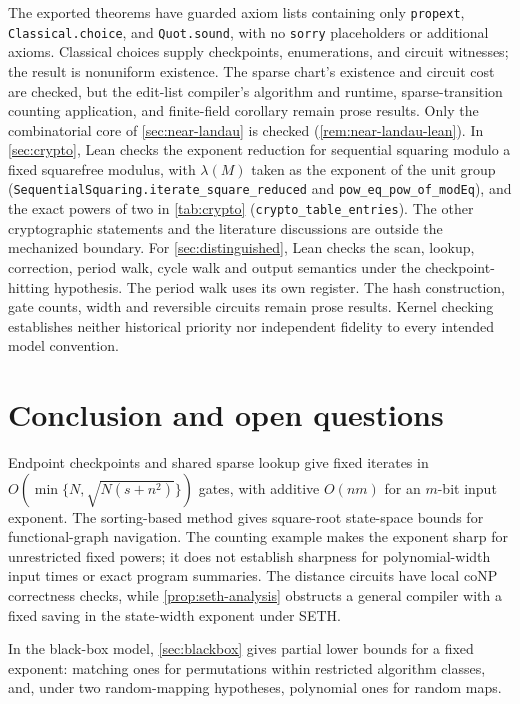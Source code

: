 \documentclass[11pt]{article}
\theoremstyle{definition}
\theoremstyle{remark}
\numberwithin{equation}{section}
\begin{document}
The exported theorems have guarded axiom lists containing only
\texttt{propext}, \texttt{Classical.choice}, and \texttt{Quot.sound}, with no
\texttt{sorry} placeholders or additional axioms.  Classical choices supply
checkpoints, enumerations, and circuit witnesses; the result is nonuniform
existence.  The sparse chart's existence and circuit cost are checked, but
the edit-list compiler's algorithm and runtime, sparse-transition counting
application, and finite-field corollary remain prose results.  Only
the combinatorial core of \cref{sec:near-landau} is checked
(\cref{rem:near-landau-lean}).  In
\cref{sec:crypto}, Lean checks the exponent reduction for sequential
squaring modulo a fixed squarefree modulus, with $\lambda(M)$ taken as
the exponent of the unit group
(\texttt{SequentialSquaring.iterate\_square\_reduced} and
\texttt{pow\_eq\_pow\_of\_modEq}), and the exact powers of two in
\cref{tab:crypto} (\texttt{crypto\_table\_entries}).  The other
cryptographic statements and the literature discussions are outside the
mechanized boundary.  For \cref{sec:distinguished}, Lean checks the scan, lookup, correction,
period walk, cycle walk and output semantics under the checkpoint-hitting
hypothesis.  The period walk uses its own register.  The hash construction,
gate counts, width and reversible circuits remain prose results.
Kernel checking establishes neither historical priority nor
independent fidelity to every intended model convention.

\section{Conclusion and open questions}\label{sec:scope}

Endpoint checkpoints and shared sparse lookup give fixed iterates in
$O(\min\{N,\sqrt{N(s+n^2)}\})$ gates, with additive $O(nm)$ for an
$m$-bit input exponent. The sorting-based method gives square-root
state-space bounds for functional-graph navigation.  The counting
example makes the exponent sharp for unrestricted fixed powers; it does not
establish sharpness for polynomial-width input times or exact program summaries.
The distance circuits have local coNP correctness checks, while
\cref{prop:seth-analysis} obstructs a general compiler with a fixed saving
in the state-width exponent under SETH.

In the black-box model, \cref{sec:blackbox} gives partial lower bounds
for a fixed exponent: matching ones for permutations within restricted
algorithm classes, and, under two random-mapping hypotheses, polynomial
ones for random maps.
\end{document}
